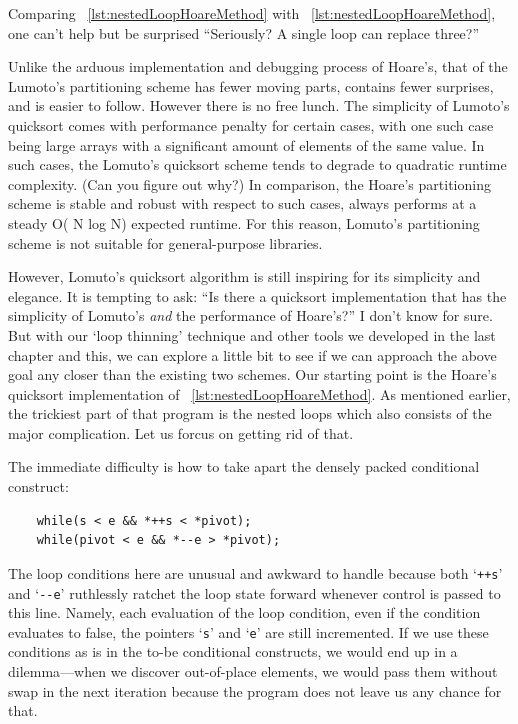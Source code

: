 \documentclass[oneside,11pt]{book}
\theoremstyle{definition}
\theoremstyle{remark}
\newcommand{\code}[1]{\mbox{\lstinline{#1}}}
\begin{document}
Comparing ~\autoref{lst:nestedLoopHoareMethod} with ~\autoref{lst:nestedLoopHoareMethod},
one can't help but be surprised ``Seriously?
A single loop can replace three?''


Unlike the arduous implementation and debugging process of Hoare's,
that of the Lumoto's partitioning scheme has fewer moving parts, contains fewer surprises, and is
easier to follow.
However there is no free lunch.
The simplicity of Lumoto's quicksort comes with performance penalty
for certain cases, with one such case being large arrays with a significant amount of elements
of the same value.
In such cases,
the Lomuto's quicksort scheme tends to degrade to quadratic runtime complexity.
(Can you figure out why?)
In comparison, the Hoare's partitioning scheme is stable and
robust with respect to such cases, always performs at a steady O( N log N) expected runtime.
For this reason, Lomuto's partitioning scheme is not suitable for general-purpose libraries.


However, Lomuto's quicksort algorithm is still inspiring for its simplicity and elegance.
It is tempting to ask: ``Is there a quicksort implementation that has the simplicity of Lomuto's
\emph{and} the performance of Hoare's?''
I don't know for sure.
But with our `loop thinning' technique and other tools we developed in the last chapter and this, we
can explore a little bit to see if we can approach the above goal any closer than the existing
two schemes.
Our starting point is the Hoare's quicksort implementation of ~\autoref{lst:nestedLoopHoareMethod}.
As mentioned earlier, the trickiest part of that program is the nested loops which also consists
of the major complication.
Let us forcus on getting rid of that.



The immediate difficulty is how to take apart the densely packed conditional construct:
\begin{lstlisting}
    while(s < e && *++s < *pivot);
    while(pivot < e && *--e > *pivot);
\end{lstlisting}
The loop conditions here are unusual and awkward to handle
because both `\code{++s}' and `\code{--e}' ruthlessly ratchet the loop state forward
whenever control is passed to this line.
Namely, each evaluation of the loop condition, even if the condition evaluates to false, the
pointers `\code{s}' and `\code{e}' are still incremented.
If we use these conditions as is in the to-be conditional constructs, we would end up in a
dilemma---when we discover out-of-place elements, we would pass them without swap in the next
iteration because the program does not leave us any chance for that.
\end{document}
